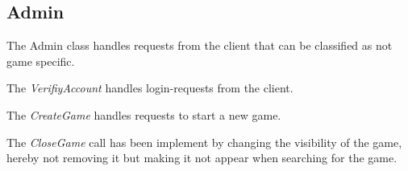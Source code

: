 \subsection{Admin}
\label{sec:adminimpl}
The Admin class handles requests from the client that can be classified as not game specific. 

The \textit{VerifiyAccount} handles login-requests from the client.

The \textit{CreateGame} handles requests to start a new game.

The \textit{CloseGame} call has been implement by changing the visibility of the game, hereby not removing it but making it not appear when searching for the game. 